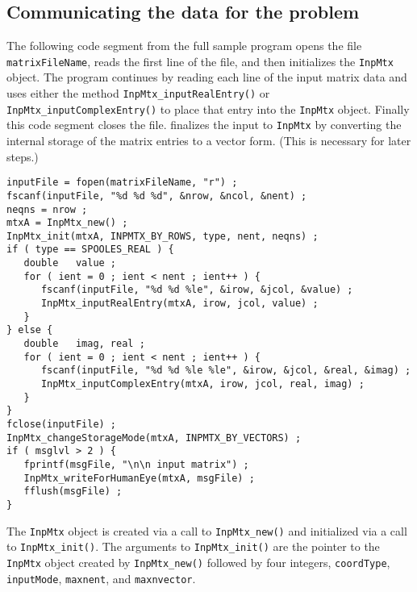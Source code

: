 \subsection{Communicating the data for the problem}
\label{subsection:serial:communicating-data}
\par
The following code segment from the full sample program opens the
file {\tt matrixFileName}, reads the first line of the file,
and then initializes the {\tt InpMtx} object.  
The program continues by reading each line of
the input matrix data and uses either the method
{\tt InpMtx\_inputRealEntry()} or {\tt InpMtx\_inputComplexEntry()}
to place that entry into the {\tt InpMtx} object.  
Finally this code segment closes the file.
finalizes the input to {\tt InpMtx} by converting the internal
storage of the matrix entries to a vector form.
(This is necessary for later steps.)
\begin{verbatim}
inputFile = fopen(matrixFileName, "r") ;
fscanf(inputFile, "%d %d %d", &nrow, &ncol, &nent) ;
neqns = nrow ;
mtxA = InpMtx_new() ;
InpMtx_init(mtxA, INPMTX_BY_ROWS, type, nent, neqns) ;
if ( type == SPOOLES_REAL ) {
   double   value ;
   for ( ient = 0 ; ient < nent ; ient++ ) {
      fscanf(inputFile, "%d %d %le", &irow, &jcol, &value) ;
      InpMtx_inputRealEntry(mtxA, irow, jcol, value) ;
   }
} else {
   double   imag, real ;
   for ( ient = 0 ; ient < nent ; ient++ ) {
      fscanf(inputFile, "%d %d %le %le", &irow, &jcol, &real, &imag) ;
      InpMtx_inputComplexEntry(mtxA, irow, jcol, real, imag) ;
   }
}
fclose(inputFile) ;
InpMtx_changeStorageMode(mtxA, INPMTX_BY_VECTORS) ;
if ( msglvl > 2 ) {
   fprintf(msgFile, "\n\n input matrix") ;
   InpMtx_writeForHumanEye(mtxA, msgFile) ;
   fflush(msgFile) ;
}
\end{verbatim}
\par
The {\tt InpMtx} object is created via a call to {\tt InpMtx\_new()}
and initialized via a call to {\tt InpMtx\_init()}.
The arguments to {\tt InpMtx\_init()} 
are the pointer to the {\tt InpMtx}
object created by {\tt InpMtx\_new()} followed by four integers,
{\tt coordType},
{\tt inputMode}, {\tt maxnent}, and {\tt maxnvector}.
